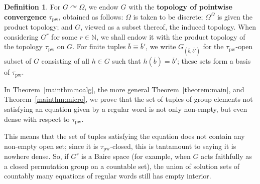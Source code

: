 \documentclass{article}
\theoremstyle{remark}
\theoremstyle{definition}
\newtheorem{definition}[theorem]{Definition}
\def\acts{\curvearrowright}
\DeclareMathOperator{\ppww}{pw}
\newcommand{\pw}{\tau_{\ppww}}
\newcommand{\spOm}{\bm{\Omega}}
\newcommand{\pwom}{\tau_{\ppww}^{\spOm}}
\begin{document}
{\begin{definition}\label{def:top} {For $G\acts\Omega$, we endow $G$ with the \textbf{topology of pointwise convergence} $\pw$, obtained as follows: $\Omega$ is taken to be discrete; $\Omega^\Omega$ is given the product topology; and $G$, viewed as a subset thereof, the induced topology. 
When considering $G^r$ for some $r\in\mathbb{N}$, we shall endow it with the product topology of the topology $\pw$ on $G$.}
For finite tuples $\overline{b}\equiv\overline{b}'$, we write $G_{(\overline{b}, \overline{b'})}$ for the {$\pw$-}open subset of $G$ consisting of all  $h\in G$ such that $h(\overline{b})=\overline{b}'$; these sets 
form a basis of $\pw$. 
\end{definition}



{In Theorem~\ref{mainthm:noalg}, the more general Theorem~\ref{theorem:main}, and Theorem~\ref{mainthm:micro}, we prove that the 
set of tuples of group elements not satisfying an equation given by a regular word is not only non-empty, but even dense with respect to $\pw$.} {This means that   the set of tuples satisfying the equation does not contain any non-empty open set; since it is $\pw$-closed, %
this is tantamount to saying it is nowhere dense. {So, if %
{$G^r$} 
is a Baire space {(for example, when {$G$}  {acts faithfully as a} %
closed permutation group on a countable set),}
the union of solution sets of countably many equations of regular words 
{still has empty interior.}}

}}
\end{document}
